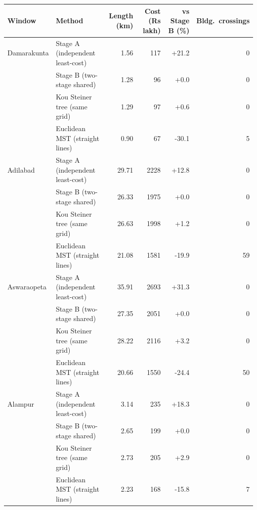\begin{tabular}{llrrrr}
\hline
Window & Method & Length (km) & Cost (Rs lakh) & vs Stage B (\%) & Bldg.\ crossings \\
\hline
Damarakunta & Stage A (independent least-cost) & 1.56 & 117 & +21.2 & 0 \\
 & Stage B (two-stage shared) & 1.28 & 96 & +0.0 & 0 \\
 & Kou Steiner tree (same grid) & 1.29 & 97 & +0.6 & 0 \\
 & Euclidean MST (straight lines) & 0.90 & 67 & -30.1 & 5 \\
\hline
Adilabad & Stage A (independent least-cost) & 29.71 & 2228 & +12.8 & 0 \\
 & Stage B (two-stage shared) & 26.33 & 1975 & +0.0 & 0 \\
 & Kou Steiner tree (same grid) & 26.63 & 1998 & +1.2 & 0 \\
 & Euclidean MST (straight lines) & 21.08 & 1581 & -19.9 & 59 \\
\hline
Aswaraopeta & Stage A (independent least-cost) & 35.91 & 2693 & +31.3 & 0 \\
 & Stage B (two-stage shared) & 27.35 & 2051 & +0.0 & 0 \\
 & Kou Steiner tree (same grid) & 28.22 & 2116 & +3.2 & 0 \\
 & Euclidean MST (straight lines) & 20.66 & 1550 & -24.4 & 50 \\
\hline
Alampur & Stage A (independent least-cost) & 3.14 & 235 & +18.3 & 0 \\
 & Stage B (two-stage shared) & 2.65 & 199 & +0.0 & 0 \\
 & Kou Steiner tree (same grid) & 2.73 & 205 & +2.9 & 0 \\
 & Euclidean MST (straight lines) & 2.23 & 168 & -15.8 & 7 \\
\hline
\end{tabular}
